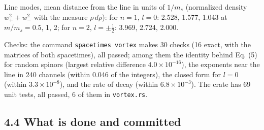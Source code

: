 \documentclass[
  10pt,
]{article}
\begin{document}
Line modes, mean distance from the line in units of \(1/m_s\)
(normalized density \(w_+^2+w_-^2\) with the measure \(\rho\,d\rho\)):
for \(n=1\), \(l=0\): 2.528, 1.577, 1.043 at \(m/m_s=0.5\), 1, 2; for
\(n=2\), \(l=\pm\tfrac12\): 3.969, 2.724, 2.000.

Checks: the command \texttt{spacetimes\ vortex} makes 30 checks (16
exact, with the matrices of both spacetimes), all passed; among them the
identity behind Eq. (5) for random spinors (largest relative difference
\(4.0\times10^{-16}\)), the exponents near the line in 240 channels
(within 0.046 of the integers), the closed form for \(l=0\) (within
\(3.3\times10^{-8}\)), and the rate of decay (within
\(6.8\times10^{-3}\)). The crate has 69 unit tests, all passed, 6 of
them in \texttt{vortex.rs}.

\hypertarget{what-is-done-and-committed}{%
\subsection{4.4 What is done and
committed}\label{what-is-done-and-committed}}
\end{document}

